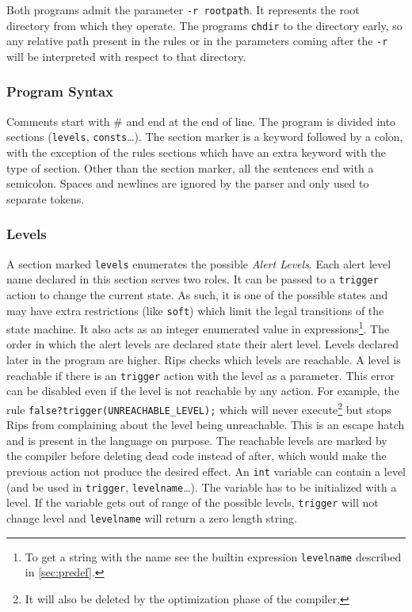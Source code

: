 \documentclass[a4paper]{article}
\begin{document}
Both programs admit the parameter \verb+-r rootpath+. It
represents the root directory from which they operate.
The programs \verb+chdir+ to the directory early, so any
relative path present in the rules or in the parameters coming
after the \verb+-r+ will be interpreted with respect to that
directory.

\subsubsection{Program Syntax}

Comments start with \# and end at the end of line.  The program is divided
into sections (\texttt{levels}, \texttt{consts}\ldots).  The section
marker is a keyword followed by a colon, with the exception of the rules
sections which have an extra keyword with the type of section.  Other than
the section marker, all the sentences end with a semicolon. Spaces and
newlines are ignored by the parser and only used to separate tokens.


\subsubsection{Levels}
A section marked \texttt{levels} enumerates the possible \emph{Alert Levels}.
Each alert level name declared in this section serves
two roles. It can be passed to a
\texttt{trigger} action to change the current state. As such, it is one of the
possible states and may have extra restrictions (like \texttt{soft})
which limit the legal transitions of the state machine. It also acts
as an integer enumerated value in expressions\footnote{To get a
string with the name see the builtin expression \texttt{levelname}
described in \ref{sec:predef}.}.  The order in which the alert levels
are declared state their alert level. Levels declared later in the
program are higher.  Rips checks which levels are reachable. A level
is reachable if there is an \texttt{trigger} action with the level as a
parameter. This error can be disabled even if the level is not reachable
by any action. For example, the rule \verb+false?trigger(UNREACHABLE_LEVEL);+ which will
never execute\footnote{It will also be deleted by the optimization phase
of the compiler.} but stops Rips from complaining about the level being unreachable.
This is an escape hatch and is present in the language on purpose.
The reachable levels are marked by the compiler before deleting dead code
instead of after, which would make the previous action not produce the
desired effect.
An \verb+int+ variable can contain a level (and be used in  \texttt{trigger},  \texttt{levelname}\ldots).
The variable has to be initialized with a level. If the variable gets out of range of the
possible levels, \texttt{trigger} will not change level and \texttt{levelname} will return a zero length string.
\end{document}
